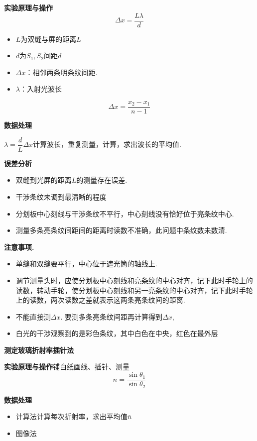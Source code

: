 \textbf{实验原理与操作}
\[ \Delta x=\frac{L\lambda}{d} \]
\begin{itemize}
\item $L$为双缝与屏的距离$L$
\item $d$为$S_1,S_2$间距$d$
\item $\Delta x$：相邻两条明条纹间距.
\item $\lambda$：入射光波长
\end{itemize}
\[ \Delta x=\frac{x_2-x_1}{n-1} \]

\textbf{数据处理}

$\lambda=\dfrac{d}{L}\Delta x$\quad 计算波长，重复测量，计算，求出波长的平均值.

\textbf{误差分析}
\begin{itemize}
\item 双缝到光屏的距离$L$的测量存在误差.
\item 干涉条纹未调到最清晰的程度
\item 分划板中心刻线与干涉条纹不平行，中心刻线没有恰好位于亮条纹中心.
\item 测量多条亮条纹间距间的距离时读数不准确，此问题中条纹数未数清. %
\end{itemize}

\textbf{注意事项.}
\begin{itemize}
\item 单缝和双缝要平行，中心位于遮光筒的轴线上.
\item 调节测量头时，应使分划板中心刻线和亮条纹的中心对齐，记下此时手轮上的读数，转动手轮，使分划板中心刻线和另一亮条纹的中心对齐，记下此时手轮上的读数，两次读数之差就表示这两条亮条纹间的距离.
\item 不能直接测$\Delta x$. 要测多条亮条纹间距再计算得到$\Delta x$,
\item 白光的干涉观察到的是彩色条纹，其中白色在中央，红色在最外层
\end{itemize}

\textbf{测定玻璃折射率\quad 插针法}

\textbf{实验原理与操作}\quad 铺白纸画线、插针、测量
\[ n=\frac{\sin\theta_1}{\sin\theta_2} \]

\textbf{数据处理}
\begin{itemize}
\item 计算法\quad 计算每次折射率，求出平均值$\bar{n}$
\item 图像法
\end{itemize}

